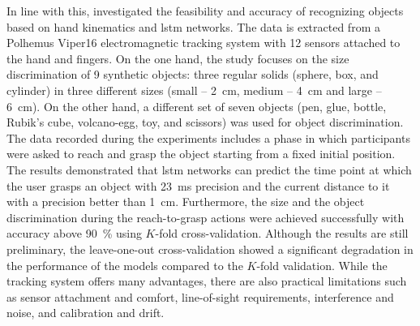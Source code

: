In line with this, \textcite{Valkov2023} investigated the feasibility and accuracy of recognizing objects based on hand kinematics and \acs{lstm} networks. The data is extracted from a Polhemus Viper16 electromagnetic tracking system with 12 sensors attached to the hand and fingers. On the one hand, the study focuses on the size discrimination of 9 synthetic objects: three regular solids (sphere, box, and cylinder) in three different sizes (small – \SI{2}{cm}, medium – \SI{4}{cm} and large – \SI{6}{cm}).  On the other hand, a different set of seven objects (pen, glue, bottle, Rubik’s cube, volcano-egg, toy, and scissors) was used for object discrimination. The data recorded during the experiments includes a phase in which participants were asked to reach and grasp the object starting from a fixed initial position. The results demonstrated that \acs{lstm} networks can predict the time point at which the user grasps an object with \SI{23}{ms} precision and the current distance to it with a precision better than \SI{1}{cm}. Furthermore, the size and the object discrimination during the reach-to-grasp actions were achieved successfully with accuracy above \SI{90}{\percent} using $K$-fold cross-validation. Although the results are still preliminary, the leave-one-out cross-validation showed a significant degradation in the performance of the models compared to the $K$-fold validation. While the tracking system offers many advantages, there are also practical limitations such as sensor attachment and comfort, line-of-sight requirements, interference and noise, and calibration and drift. 

